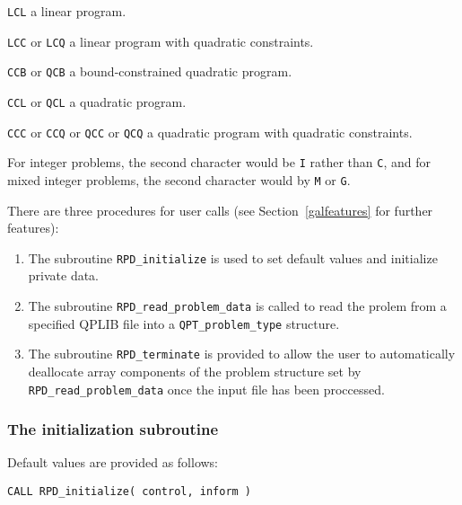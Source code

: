 \documentclass{galahad}
\newcommand{\packagename}{RPD}
\begin{document}
\begin{description}
\begin{description}
     \item {\tt LCL}              a linear program.
     \item {\tt LCC} or {\tt LCQ} a linear program with quadratic constraints.
     \item {\tt CCB} or {\tt QCB} a bound-constrained quadratic program.
     \item {\tt CCL} or {\tt QCL} a quadratic program.
     \item {\tt CCC} or {\tt CCQ} or {\tt QCC} or {\tt QCQ} 
           a quadratic program with quadratic constraints.
\end{description}
For integer problems, the second character would be {\tt I} rather 
than {\tt C}, and for mixed integer problems, the second character 
would by {\tt M} or {\tt G}.

\end{description}


\galarguments
There are three procedures for user calls
(see Section~\ref{galfeatures} for further features):

\begin{enumerate}
\item The subroutine
      {\tt \packagename\_initialize}
      is used to set default values and initialize private data.
\item The subroutine
      {\tt \packagename\_read\_problem\_data}
      is called to read the prolem from a specified
      QPLIB file into a {\tt QPT\_problem\_type} structure.
\item The subroutine
      {\tt \packagename\_terminate}
      is provided to allow the user to automatically deallocate array
       components of the problem structure set by
       {\tt \packagename\_read\_problem\_data} once
       the input file has been proccessed.
\end{enumerate}


\subsubsection{The initialization subroutine}\label{subinit}
 Default values are provided as follows:

\hskip0.5in
{\tt CALL \packagename\_initialize( control, inform )}
\end{document}

